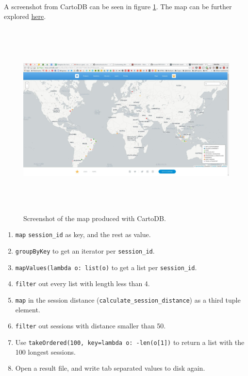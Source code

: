A screenshot from CartoDB can be seen in figure \ref{fig:cartodb}. The map can be further explored \href{https://esso.cartodb.com/viz/dbcd3dce-063e-11e6-b0d7-0e8c56e2ffdb/public_map}{here}.
\begin{figure}
\centering
\includegraphics[height=10cm]{figs/cartodb.jpg}
\caption{Screenshot of the map produced with CartoDB.}
\label{fig:cartodb}
\end{figure}

\begin{enumerate}
    \item \verb|map| \verb|session_id| as key, and the rest as value.
    \item \verb|groupByKey| to get an iterator per \verb|session_id|.
    \item \verb|mapValues(lambda o: list(o)| to get a list per \verb|session_id|.
    \item \verb|filter| out every list with length less than 4. 
    \item \verb|map| in the session distance (\verb|calculate_session_distance|) as a third tuple element.
    \item \verb|filter| out sessions with distance smaller than 50.
    \item Use \verb|takeOrdered(100, key=lambda o: -len(o[1])| to return a list with the 100 longest sessions.
    \item Open a result file, and write tab separated values to disk again. 
\end{enumerate}


